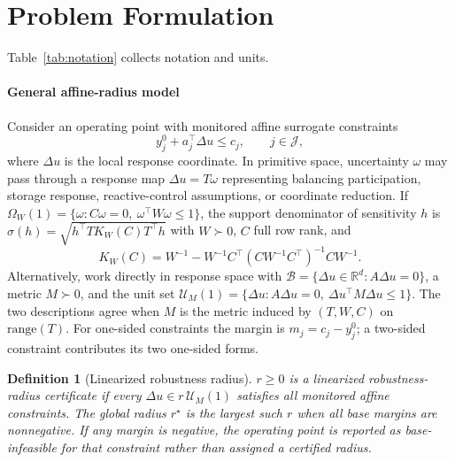 \documentclass[11pt]{article}
\newtheorem{definition}{Definition}
\newcommand{\R}{\mathbb{R}}
\begin{document}
\section{Problem Formulation}
\label{sec:formulation}

Table~\ref{tab:notation} collects notation and units.



\paragraph{General affine-radius model}
Consider an operating point with monitored affine surrogate constraints
\begin{equation}
  y_j^0+a_j^\top\Delta u \le c_j,
  \qquad j\in\mathcal{J},
\end{equation}
where $\Delta u$ is the local response coordinate.  In primitive space,
uncertainty $\omega$ may pass through a response map $\Delta u=T\omega$
representing balancing participation, storage response, reactive-control
assumptions, or coordinate reduction.  If
$\Omega_W(1)=\{\omega:C\omega=0,\ \omega^\top W\omega\le1\}$, the support
denominator of sensitivity $h$ is
$\sigma(h)=\sqrt{h^\top T K_W(C)T^\top h}$ with $W\succ0$, $C$ full row
rank, and
\begin{equation}
  K_W(C)=W^{-1}-W^{-1}C^\top(CW^{-1}C^\top)^{-1}CW^{-1}.
\end{equation}
Alternatively, work directly in response space with
$\mathcal{B}=\{\Delta u\in\R^d:A\Delta u=0\}$, a metric $M\succ0$, and the
unit set $\mathcal{U}_M(1)=\{\Delta u:A\Delta u=0,\ \Delta u^\top M\Delta
u\le1\}$.  The two descriptions agree when $M$ is the metric induced by
$(T,W,C)$ on $\mathrm{range}(T)$.  For one-sided constraints the margin is
$m_j=c_j-y_j^0$; a two-sided constraint contributes its two one-sided forms.

\begin{definition}[Linearized robustness radius]
$r\ge0$ is a linearized robustness-radius certificate if every
$\Delta u\in r\,\mathcal{U}_M(1)$ satisfies all monitored affine
constraints.  The global radius $r^\star$ is the largest such $r$ when all
base margins are nonnegative.  If any margin is negative, the operating
point is reported as base-infeasible for that constraint rather than
assigned a certified radius.
\end{definition}
\end{document}
